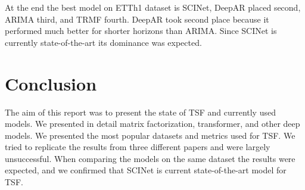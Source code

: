 \documentclass[conference]{IEEEtran}
\begin{document}
At the end the best model on ETTh1 dataset is SCINet, DeepAR placed second, ARIMA third, and TRMF fourth. DeepAR took second place because it performed much better for shorter horizons than ARIMA.
Since SCINet is currently state-of-the-art its dominance was expected.

\section{Conclusion}

The aim of this report was to present the state of TSF and currently used models. We presented in detail matrix factorization, transformer, and other deep models. We presented the most popular datasets and metrics used for TSF.
We tried to replicate the results from three different papers and were largely unsuccessful. When comparing the models on the same dataset the results were expected, and we confirmed that SCINet is current state-of-the-art model for TSF.



\printbibliography[heading=bibintoc,title={References}]
\end{document}
